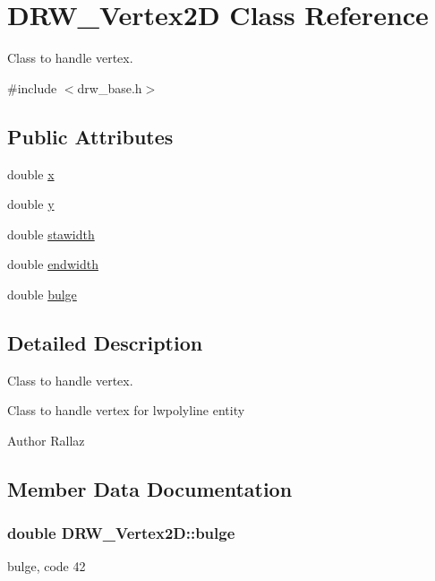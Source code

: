 \hypertarget{class_d_r_w___vertex2_d}{}\section{D\+R\+W\+\_\+\+Vertex2\+D Class Reference}
\label{class_d_r_w___vertex2_d}


Class to handle vertex.  




{\ttfamily \#include $<$drw\+\_\+base.\+h$>$}

\subsection*{Public Attributes}
\begin{DoxyCompactItemize}
\item 
double \hyperlink{class_d_r_w___vertex2_d_abe6dee44053f5d82387209e7c76186c8}{x}
\item 
double \hyperlink{class_d_r_w___vertex2_d_a45e73443961543c05bff340dfe14cb8e}{y}
\item 
double \hyperlink{class_d_r_w___vertex2_d_a5d3c878a768fa6c10f158a2bbd9726ca}{stawidth}
\item 
double \hyperlink{class_d_r_w___vertex2_d_a810d285d1f81da75a895ade902e8d159}{endwidth}
\item 
double \hyperlink{class_d_r_w___vertex2_d_a844591ce6d6f01562b831afe4261e99f}{bulge}
\end{DoxyCompactItemize}


\subsection{Detailed Description}
Class to handle vertex. 

Class to handle vertex for lwpolyline entity \begin{DoxyAuthor}{Author}
Rallaz 
\end{DoxyAuthor}


\subsection{Member Data Documentation}
\hypertarget{class_d_r_w___vertex2_d_a844591ce6d6f01562b831afe4261e99f}{}
\subsubsection[{bulge}]{\setlength{\rightskip}{0pt plus 5cm}double D\+R\+W\+\_\+\+Vertex2\+D\+::bulge}\label{class_d_r_w___vertex2_d_a844591ce6d6f01562b831afe4261e99f}
bulge, code 42 \hypertarget{class_d_r_w___vertex2_d_a810d285d1f81da75a895ade902e8d159}{}

